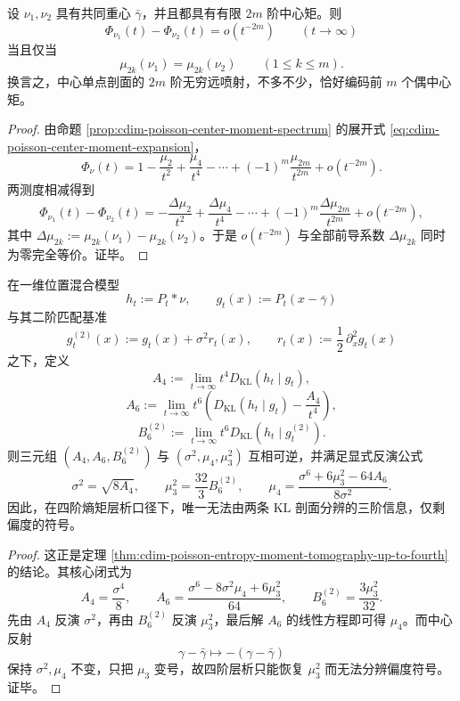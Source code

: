 \begin{corollary}[中心单点剖面的有限阶喷射严格等价于偶矩锁定]\label{cor:conclusion-poisson-central-slice-even-moment-jet-rigidity}
设 \(\nu_1,\nu_2\) 具有共同重心 \(\bar\gamma\)，并且都具有有限 \(2m\) 阶中心矩。则
\[
\Phi_{\nu_1}(t)-\Phi_{\nu_2}(t)=o(t^{-2m})
\qquad (t\to\infty)
\]
当且仅当
\[
\mu_{2k}(\nu_1)=\mu_{2k}(\nu_2)
\qquad (1\le k\le m).
\]
换言之，中心单点剖面的 \(2m\) 阶无穷远喷射，不多不少，恰好编码前 \(m\) 个偶中心矩。
\end{corollary}
\begin{proof}
由命题 \ref{prop:cdim-poisson-center-moment-spectrum} 的展开式 \eqref{eq:cdim-poisson-center-moment-expansion}，
\[
\Phi_\nu(t)
=
1-\frac{\mu_2}{t^2}+\frac{\mu_4}{t^4}-\cdots+(-1)^m\frac{\mu_{2m}}{t^{2m}}+o(t^{-2m}).
\]
两测度相减得到
\[
\Phi_{\nu_1}(t)-\Phi_{\nu_2}(t)
=
-\frac{\Delta\mu_2}{t^2}
+\frac{\Delta\mu_4}{t^4}
-\cdots
+(-1)^m\frac{\Delta\mu_{2m}}{t^{2m}}
+o(t^{-2m}),
\]
其中 \(\Delta\mu_{2k}:=\mu_{2k}(\nu_1)-\mu_{2k}(\nu_2)\)。于是 \(o(t^{-2m})\) 与全部前导系数 \(\Delta\mu_{2k}\) 同时为零完全等价。证毕。
\end{proof}

\begin{theorem}[两条 KL 剖面在四阶层面给出最小完备的熵矩层析]\label{thm:conclusion-poisson-two-kl-minimal-entropy-moment-tomography}
在一维位置混合模型
\[
h_t:=P_t*\nu,
\qquad
g_t(x):=P_t(x-\bar\gamma)
\]
与其二阶匹配基准
\[
g_t^{(2)}(x):=g_t(x)+\sigma^2 r_t(x),
\qquad
r_t(x):=\frac12\,\partial_x^2 g_t(x)
\]
之下，定义
\[
A_4:=\lim_{t\to\infty} t^4 D_{\mathrm{KL}}(h_t\mid g_t),
\]
\[
A_6:=\lim_{t\to\infty} t^6\!\left(D_{\mathrm{KL}}(h_t\mid g_t)-\frac{A_4}{t^4}\right),
\]
\[
B_6^{(2)}:=\lim_{t\to\infty} t^6 D_{\mathrm{KL}}(h_t\mid g_t^{(2)}).
\]
则三元组 \((A_4,A_6,B_6^{(2)})\) 与 \((\sigma^2,\mu_4,\mu_3^2)\) 互相可逆，并满足显式反演公式
\[
\sigma^2=\sqrt{8A_4},
\qquad
\mu_3^2=\frac{32}{3}B_6^{(2)},
\qquad
\mu_4=\frac{\sigma^6+6\mu_3^2-64A_6}{8\sigma^2}.
\]
因此，在四阶熵矩层析口径下，唯一无法由两条 KL 剖面分辨的三阶信息，仅剩偏度的符号。
\end{theorem}
\begin{proof}
这正是定理 \ref{thm:cdim-poisson-entropy-moment-tomography-up-to-fourth} 的结论。其核心闭式为
\[
A_4=\frac{\sigma^4}{8},
\qquad
A_6=\frac{\sigma^6-8\sigma^2\mu_4+6\mu_3^2}{64},
\qquad
B_6^{(2)}=\frac{3\mu_3^2}{32}.
\]
先由 \(A_4\) 反演 \(\sigma^2\)，再由 \(B_6^{(2)}\) 反演 \(\mu_3^2\)，最后解 \(A_6\) 的线性方程即可得 \(\mu_4\)。而中心反射
\[
\gamma-\bar\gamma\longmapsto -(\gamma-\bar\gamma)
\]
保持 \(\sigma^2,\mu_4\) 不变，只把 \(\mu_3\) 变号，故四阶层析只能恢复 \(\mu_3^2\) 而无法分辨偏度符号。证毕。
\end{proof}

